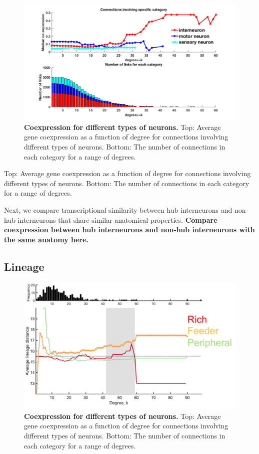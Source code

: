 \documentclass[10pt,letterpaper]{article}
\begin{document}
\begin{figure}[!h]
\centering
    \includegraphics[width=1\textwidth]{coexpressionInvolvingCategory}
 \caption{{\bf Coexpression for different types of neurons. }
Top: Average gene coexpression as a function of degree for connections involving different types of neurons. Bottom: The number of connections in each category for a range of degrees.}
 \label{NeuronTypePlot}
 \end{figure}
Top: Average gene coexpression as a function of degree for connections involving different types of neurons. Bottom: The number of connections in each category for a range of degrees.

Next, we compare transcriptional similarity between hub interneurons and non-hub interneurons that share similar anatomical properties.
\textbf{Compare coexpression between hub interneurons and non-hub interneurons with the same anatomy here.}
\subsection*{Lineage}
\begin{figure}[!h]
\centering
    \includegraphics[width=1\textwidth]{LineageRFP}
 \caption{{\bf Coexpression for different types of neurons. }
Top: Average gene coexpression as a function of degree for connections involving different types of neurons. Bottom: The number of connections in each category for a range of degrees. }
 \label{Lineage}
 \end{figure}
\end{document}
